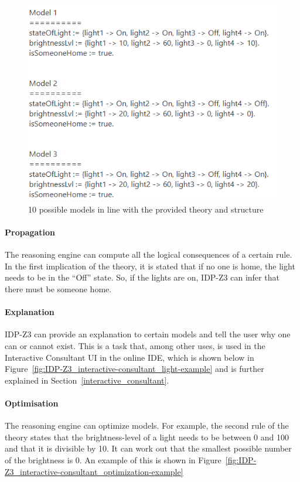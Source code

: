 \documentclass[11pt,a4paper]{report}
\begin{document}
\begin{figure}
    \centering
    \includegraphics[width=0.8\linewidth]{images/IDP-Z3_model-generation.png}
    \caption{10 possible models in line with the provided theory and structure}
    \label{fig:IDP-Z3_model-generation}
\end{figure}

\paragraph{Propagation}
The reasoning engine can compute all the logical consequences of a certain rule. In the first implication of the theory, it is stated that if no one is home, the light needs to be in the ``Off'' state. So, if the lights are on, IDP-Z3 can infer that there must be someone home.

\paragraph{Explanation}
IDP-Z3 can provide an explanation to certain models and tell the user why one can or cannot exist. This is a task that, among other uses, is used in the Interactive Consultant UI in the online IDE, which is shown below in Figure~\ref{fig:IDP-Z3_interactive-consultant_light-example} and is further explained in Section~\ref{interactive_consultant}.

\paragraph{Optimisation}
The reasoning engine can optimize models. For example, the second rule of the theory states that the brightness-level of a light needs to be between 0 and 100 and that it is divisible by 10. It can work out that the smallest possible number of the brightness is 0. An example of this is shown in Figure~\ref{fig:IDP-Z3_interactive-consultant_optimization-example}
\end{document}

